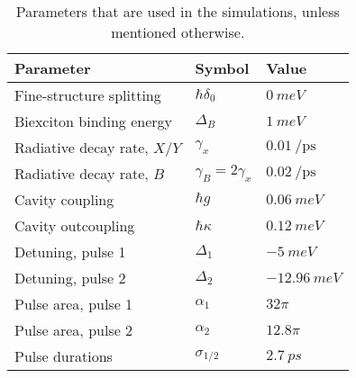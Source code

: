 \documentclass[%
 reprint,superscriptaddress,
 amsmath,amssymb,
 aps]{revtex4-2}
\begin{document}
\begin{table}[]
    \centering
    \caption{Parameters that are used in the simulations, unless mentioned otherwise.}
    \begin{tabular}{l l l}
    \hline\hline
    Parameter & Symbol & Value \\
    \hline
    Fine-structure splitting & $\hbar\delta_0$ & $\SI{0}{meV}$\\
     Biexciton binding energy & $\Delta_B$  & $\SI{1}{meV}$ \\
     Radiative decay rate, $X/Y$ & $\gamma_x$ & $\SI{0.01}{\per\pico\second}$\\
     Radiative decay rate, $B$ &  $\gamma_B = 2 \gamma_x$ \hspace{0.5cm} & $\SI{0.02}{\per\pico\second}$\\
     Cavity coupling & $\hbar g$ & $\SI{0.06}{meV}$\\
     Cavity outcoupling & $\hbar\kappa$ & $\SI{0.12}{meV}$\\
     Detuning, pulse 1 & $\Delta_1$ & $\SI{-5}{meV}$\\
     Detuning, pulse 2 & $\Delta_2$ & $\SI{-12.96}{meV}$\\
     Pulse area, pulse 1  & $\alpha_1$ & $32\pi$\\
     Pulse area, pulse 2 & $\alpha_2$ & $12.8\pi$\\
     Pulse durations & $\sigma_{1/2}$ & $\SI{2.7}{ps}$ \\
     \hline\hline
    \end{tabular}
    \label{tab:parameters}
\end{table}
\end{document}
